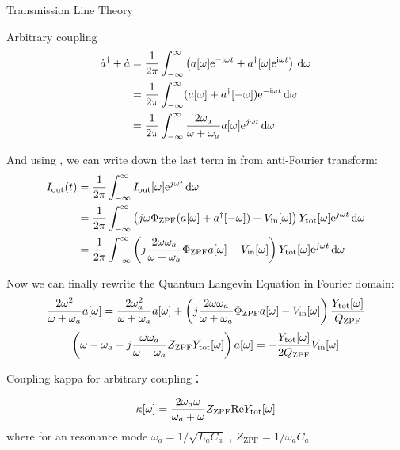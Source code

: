 \begin{section}{Transmission Line Theory}
\begin{subsection}{Arbitrary coupling}
\begin{equation}
\begin{aligned}
\dot{a}^\dagger + \dot{a} &= \frac{1}{2\pi}\integral{\left(a[\omega] \exp{-\ii \omega t} + \ad[\omega] \exp{\ii \omega t}\right)}{\omega}{-\inf}{\inf} \\
&= \frac{1}{2\pi}\integral{( a[\omega] + \ad[- \omega] )\exp{- \ii \omega t}}{\omega}{-\inf}{\inf} \\
&= \frac{1}{2\pi}\integral{ \frac{2\omega_a}{\omega + \omega_a} a[\omega] \exp{j \omega t}}{\omega}{-\inf}{\inf}
\end{aligned}
\end{equation}

And using , we can write down the last term in  from anti-Fourier transform: 
\begin{equation}
\begin{aligned}
I_\out(t) &= \frac{1}{2\pi}\integral{I_\out[\omega]\exp{j\omega t}}{\omega}{-\inf}{\inf} \\
&= \frac{1}{2\pi}\integral{\left( j \omega \Phi_\ZPF (a[\omega] + \ad[-\omega]) - V_\in[\omega] \right) Y_\tot[\omega]\exp{j\omega t}}{\omega}{-\inf}{\inf}\\
&= \frac{1}{2\pi}\integral{\left( j\frac{2\omega \omega_a}{\omega + \omega_a} \Phi_\ZPF a[\omega] - V_\in[\omega] \right) Y_\tot[\omega]\exp{j\omega t}}{\omega}{-\inf}{\inf}
\end{aligned}
\end{equation}

Now we can finally rewrite the Quantum Langevin Equation  in Fourier domain: 
\begin{equation}
\frac{2\omega^2}{\omega + \omega_a} a[\omega] =\frac{2\omega_a^2}{\omega + \omega_a}a[\omega] + \left( j\frac{2\omega \omega_a}{\omega + \omega_a} \Phi_\ZPF a[\omega] - V_\in[\omega] \right) \frac{Y_\tot[\omega]}{Q_\ZPF}
\end{equation}
\begin{equation}\label{eq:QLE}
\left( \omega - \omega_a - j \frac{\omega \omega_a}{\omega + \omega_a} Z_\ZPF Y_\tot[\omega]\right) a[\omega] = - \frac{Y_\tot[\omega]}{2Q_\ZPF} V_\in[\omega]
\end{equation}

Coupling kappa for arbitrary coupling：

\begin{equation}\label{eq:kappa}
\kappa[\omega] = \frac{2 \omega_a \omega}{\omega_a + \omega} Z_\mathrm{ZPF} \mathrm{Re}Y_\tot[\omega]
\end{equation}
where for an resonance mode $\omega_a = 1 / \sqrt{L_a C_a}$    ,    $Z_\mathrm{ZPF} = 1/\omega_a C_a$


\end{subsection}
\end{section}
